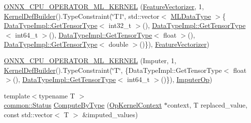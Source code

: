 \begin{DoxyCompactItemize}
\mbox{\hyperlink{namespaceonnxruntime_1_1ml_ab17dcb3106fa731293942c57e74e26fe}{O\+N\+N\+X\+\_\+\+C\+P\+U\+\_\+\+O\+P\+E\+R\+A\+T\+O\+R\+\_\+\+M\+L\+\_\+\+K\+E\+R\+N\+EL}} (\mbox{\hyperlink{classonnxruntime_1_1ml_1_1FeatureVectorizer}{Feature\+Vectorizer}}, 1, \mbox{\hyperlink{classonnxruntime_1_1KernelDefBuilder}{Kernel\+Def\+Builder}}().Type\+Constraint(\char`\"{}T1\char`\"{}, std\+::vector$<$ \mbox{\hyperlink{namespaceonnxruntime_ad77d0a6e838ec7da5dc35fed5ee66b49}{M\+L\+Data\+Type}} $>$\{ \mbox{\hyperlink{classonnxruntime_1_1DataTypeImpl_a7c4a6a7126bc7661eb67af6dfcfad1fb}{Data\+Type\+Impl\+::\+Get\+Tensor\+Type}}$<$ int32\+\_\+t $>$(), \mbox{\hyperlink{classonnxruntime_1_1DataTypeImpl_a7c4a6a7126bc7661eb67af6dfcfad1fb}{Data\+Type\+Impl\+::\+Get\+Tensor\+Type}}$<$ int64\+\_\+t $>$(), \mbox{\hyperlink{classonnxruntime_1_1DataTypeImpl_a7c4a6a7126bc7661eb67af6dfcfad1fb}{Data\+Type\+Impl\+::\+Get\+Tensor\+Type}}$<$ float $>$(), \mbox{\hyperlink{classonnxruntime_1_1DataTypeImpl_a7c4a6a7126bc7661eb67af6dfcfad1fb}{Data\+Type\+Impl\+::\+Get\+Tensor\+Type}}$<$ double $>$()\}), \mbox{\hyperlink{classonnxruntime_1_1ml_1_1FeatureVectorizer}{Feature\+Vectorizer}})
\item 
\mbox{\hyperlink{namespaceonnxruntime_1_1ml_a8bb6a6521c3fd428bac2d44db9984a82}{O\+N\+N\+X\+\_\+\+C\+P\+U\+\_\+\+O\+P\+E\+R\+A\+T\+O\+R\+\_\+\+M\+L\+\_\+\+K\+E\+R\+N\+EL}} (Imputer, 1, \mbox{\hyperlink{classonnxruntime_1_1KernelDefBuilder}{Kernel\+Def\+Builder}}().Type\+Constraint(\char`\"{}T\char`\"{}, \{Data\+Type\+Impl\+::\+Get\+Tensor\+Type$<$ float $>$(), \mbox{\hyperlink{classonnxruntime_1_1DataTypeImpl_a7c4a6a7126bc7661eb67af6dfcfad1fb}{Data\+Type\+Impl\+::\+Get\+Tensor\+Type}}$<$ int64\+\_\+t $>$()\}), \mbox{\hyperlink{classonnxruntime_1_1ml_1_1ImputerOp}{Imputer\+Op}})
\item 
{\footnotesize template$<$typename T $>$ }\\\mbox{\hyperlink{classonnxruntime_1_1common_1_1Status}{common\+::\+Status}} \mbox{\hyperlink{namespaceonnxruntime_1_1ml_ae476dce0c2b6b1cb084069460f091270}{Compute\+By\+Type}} (\mbox{\hyperlink{classonnxruntime_1_1OpKernelContext}{Op\+Kernel\+Context}} $\ast$context, T replaced\+\_\+value, const std\+::vector$<$ T $>$ \&imputed\+\_\+values)
\item 

\end{DoxyCompactItemize}
